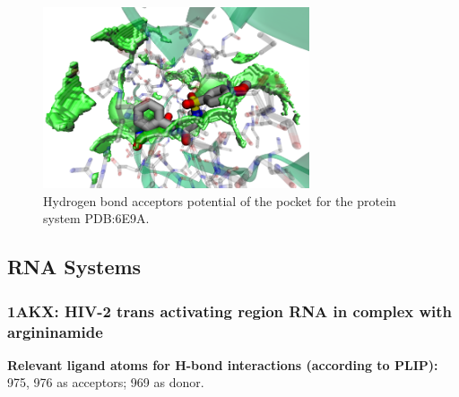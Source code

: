       \begin{figure}[H]
        \centering
        \includegraphics[width=0.7\textwidth]{figures/results/benchmark_prot/6e9a.png}
        \caption{\label{fig:benchmark/6e9a} Hydrogen bond acceptors potential of the pocket for the protein system PDB:6E9A.}
      \end{figure}
    \pagebreak

  \subsection{RNA Systems}
    \subsubsection{1AKX: HIV-2 trans activating region RNA in complex with argininamide}
      \textbf{Relevant ligand atoms for H-bond interactions (according to PLIP):} 975, 976 as acceptors; 969 as donor.

